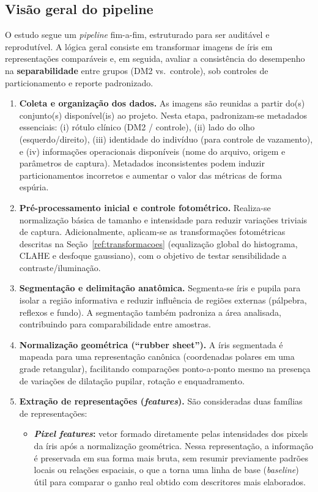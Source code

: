 \documentclass[12pt,a4paper]{article}
\begin{document}
\subsection{Visão geral do pipeline}
O estudo segue um \textit{pipeline} fim-a-fim, estruturado para ser auditável e reprodutível. A lógica geral consiste em transformar imagens de íris em representações comparáveis e, em seguida, avaliar a consistência do desempenho na \textbf{separabilidade} entre grupos (DM2 vs.\ controle), sob controles de particionamento e reporte padronizado.

\begin{enumerate}
    \item \textbf{Coleta e organização dos dados.}
    As imagens são reunidas a partir do(s) conjunto(s) disponível(is) ao projeto. Nesta etapa, padronizam-se metadados essenciais: (i) rótulo clínico (DM2 / controle), (ii) lado do olho (esquerdo/direito), (iii) identidade do indivíduo (para controle de vazamento), e (iv) informações operacionais disponíveis (nome do arquivo, origem e parâmetros de captura). Metadados inconsistentes podem induzir particionamentos incorretos e aumentar o valor das métricas de forma espúria.

    \item \textbf{Pré-processamento inicial e controle fotométrico.}
    Realiza-se normalização básica de tamanho e intensidade para reduzir variações triviais de captura. Adicionalmente, aplicam-se as transformações fotométricas descritas na Seção~\ref{ref:transformacoes} (equalização global do histograma, CLAHE e desfoque gaussiano), com o objetivo de testar sensibilidade a contraste/iluminação.

    \item \textbf{Segmentação e delimitação anatômica.}
    Segmenta-se íris e pupila para isolar a região informativa e reduzir influência de regiões externas (pálpebra, reflexos e fundo). A segmentação também padroniza a área analisada, contribuindo para comparabilidade entre amostras.

    \item \textbf{Normalização geométrica (``rubber sheet'').}
    A íris segmentada é mapeada para uma representação canônica (coordenadas polares em uma grade retangular), facilitando comparações ponto-a-ponto mesmo na presença de variações de dilatação pupilar, rotação e enquadramento.

\item \textbf{Extração de representações (\textit{features}).}
São consideradas duas famílias de representações:
\begin{itemize}
    \item \textbf{\textit{Pixel features}:} vetor formado diretamente pelas intensidades dos pixels da íris após a normalização geométrica. Nessa representação, a informação é preservada em sua forma mais bruta, sem resumir previamente padrões locais ou relações espaciais, o que a torna uma linha de base (\textit{baseline}) útil para comparar o ganho real obtido com descritores mais elaborados. \citep{GonzalezWoods2018}


\end{itemize}
\end{enumerate}
\end{document}
